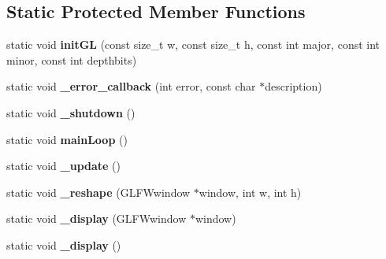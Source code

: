 \subsection*{\-Static \-Protected \-Member \-Functions}
\begin{DoxyCompactItemize}
\item 
\hypertarget{classs9_1_1gl_1_1GLFWApp_a66c45346df5e95068043478056a47b4d}{static void {\bfseries init\-G\-L} (const size\-\_\-t w, const size\-\_\-t h, const int major, const int minor, const int depthbits)}\label{classs9_1_1gl_1_1GLFWApp_a66c45346df5e95068043478056a47b4d}

\item 
\hypertarget{classs9_1_1gl_1_1GLFWApp_a1c57eeeda2370c71d767439650e7b066}{static void {\bfseries \-\_\-error\-\_\-callback} (int error, const char $\ast$description)}\label{classs9_1_1gl_1_1GLFWApp_a1c57eeeda2370c71d767439650e7b066}

\item 
\hypertarget{classs9_1_1gl_1_1GLFWApp_ae04abf149f8f13e9872fd3de6e39ca06}{static void {\bfseries \-\_\-shutdown} ()}\label{classs9_1_1gl_1_1GLFWApp_ae04abf149f8f13e9872fd3de6e39ca06}

\item 
\hypertarget{classs9_1_1gl_1_1GLFWApp_a267576d5ae88b0fa2d8393b1ffa358f4}{static void {\bfseries main\-Loop} ()}\label{classs9_1_1gl_1_1GLFWApp_a267576d5ae88b0fa2d8393b1ffa358f4}

\item 
\hypertarget{classs9_1_1gl_1_1GLFWApp_ae845753b4761741ca259aa7135b0b8ef}{static void {\bfseries \-\_\-update} ()}\label{classs9_1_1gl_1_1GLFWApp_ae845753b4761741ca259aa7135b0b8ef}

\item 
\hypertarget{classs9_1_1gl_1_1GLFWApp_a3cd3b3db888c3b5f4758b3cf19101382}{static void {\bfseries \-\_\-reshape} (\-G\-L\-F\-Wwindow $\ast$window, int w, int h)}\label{classs9_1_1gl_1_1GLFWApp_a3cd3b3db888c3b5f4758b3cf19101382}

\item 
\hypertarget{classs9_1_1gl_1_1GLFWApp_a26677932d0d6e7d70c13074e80ccf0fa}{static void {\bfseries \-\_\-display} (\-G\-L\-F\-Wwindow $\ast$window)}\label{classs9_1_1gl_1_1GLFWApp_a26677932d0d6e7d70c13074e80ccf0fa}

\item 
\hypertarget{classs9_1_1gl_1_1GLFWApp_a50f938d530b1a8a10e024c8b96d26144}{static void {\bfseries \-\_\-display} ()}\label{classs9_1_1gl_1_1GLFWApp_a50f938d530b1a8a10e024c8b96d26144}


\end{DoxyCompactItemize}
